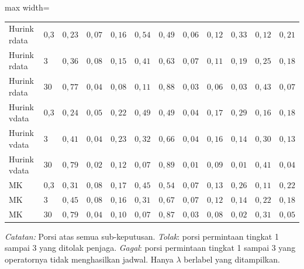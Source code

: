 \begin{table}[htbp]
\begin{adjustbox}{max width=\textwidth}
\begin{tabular}{llrrrrrrrrrr}
\addlinespace
Hurink rdata & 0{,}3 & $0{,}23$ & $0{,}07$ & $0{,}16$ & $0{,}54$ & $0{,}49$ & $0{,}06$ & $0{,}12$ & $0{,}33$ & $0{,}12$ & $0{,}21$ \\
Hurink rdata & 3 & $0{,}36$ & $0{,}08$ & $0{,}15$ & $0{,}41$ & $0{,}63$ & $0{,}07$ & $0{,}11$ & $0{,}19$ & $0{,}25$ & $0{,}18$ \\
Hurink rdata & 30 & $0{,}77$ & $0{,}04$ & $0{,}08$ & $0{,}11$ & $0{,}88$ & $0{,}03$ & $0{,}06$ & $0{,}03$ & $0{,}43$ & $0{,}07$ \\
\addlinespace
Hurink vdata & 0{,}3 & $0{,}24$ & $0{,}05$ & $0{,}22$ & $0{,}49$ & $0{,}49$ & $0{,}04$ & $0{,}17$ & $0{,}29$ & $0{,}16$ & $0{,}18$ \\
Hurink vdata & 3 & $0{,}41$ & $0{,}04$ & $0{,}23$ & $0{,}32$ & $0{,}66$ & $0{,}04$ & $0{,}16$ & $0{,}14$ & $0{,}30$ & $0{,}13$ \\
Hurink vdata & 30 & $0{,}79$ & $0{,}02$ & $0{,}12$ & $0{,}07$ & $0{,}89$ & $0{,}01$ & $0{,}09$ & $0{,}01$ & $0{,}41$ & $0{,}04$ \\
\addlinespace
MK & 0{,}3 & $0{,}31$ & $0{,}08$ & $0{,}17$ & $0{,}45$ & $0{,}54$ & $0{,}07$ & $0{,}13$ & $0{,}26$ & $0{,}11$ & $0{,}22$ \\
MK & 3 & $0{,}45$ & $0{,}08$ & $0{,}16$ & $0{,}31$ & $0{,}67$ & $0{,}07$ & $0{,}12$ & $0{,}14$ & $0{,}22$ & $0{,}18$ \\
MK & 30 & $0{,}79$ & $0{,}04$ & $0{,}10$ & $0{,}07$ & $0{,}87$ & $0{,}03$ & $0{,}08$ & $0{,}02$ & $0{,}31$ & $0{,}05$ \\
\bottomrule
\end{tabular}
\end{adjustbox}
\par\smallskip\footnotesize\textit{Catatan:} Porsi atas semua sub-keputusan. \emph{Tolak}: porsi permintaan tingkat 1 sampai 3 yang ditolak penjaga. \emph{Gagal}: porsi permintaan tingkat 1 sampai 3 yang operatornya tidak menghasilkan jadwal. Hanya $\lambda$ berlabel yang ditampilkan.
\end{table}
